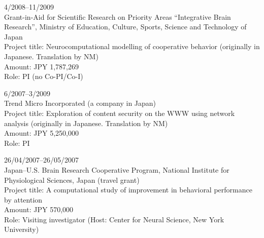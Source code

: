 \documentclass[11pt,letter]{article}
\renewenvironment{itemize}{
  \begin{list}{}{
    \setlength{\leftmargin}{1.5em}
    \setlength{\itemsep}{0.25em}
    \setlength{\parskip}{0pt}
    \setlength{\parsep}{0.25em}
  }
}{
  \end{list}
}
\begin{document}
\begin{itemize}

\item 4/2008--11/2009\\
Grant-in-Aid for Scientific Research on Priority Areas ``Integrative Brain Research'', Ministry of Education, Culture, Sports, Science and Technology of Japan\\
Project title: Neurocomputational modelling of cooperative behavior (originally in Japanese. Translation by NM)\\
Amount: JPY 1,787,269\\
Role: PI (no Co-PI/Co-I)


\item 6/2007--3/2009\\
Trend Micro Incorporated (a company in Japan)\\
Project title: Exploration of content security on the WWW using network analysis (originally in Japanese. Translation by NM)\\
Amount: JPY 5,250,000\\
Role: PI

\item 26/04/2007--26/05/2007\\
Japan--U.S. Brain Research Cooperative Program, National Institute for Physiological Sciences, Japan (travel grant)\\
Project title: A computational study of improvement in behavioral performance by attention\\
Amount: JPY 570,000\\
Role: Visiting investigator (Host: Center for Neural Science, New York University)


\end{itemize}
\end{document}
